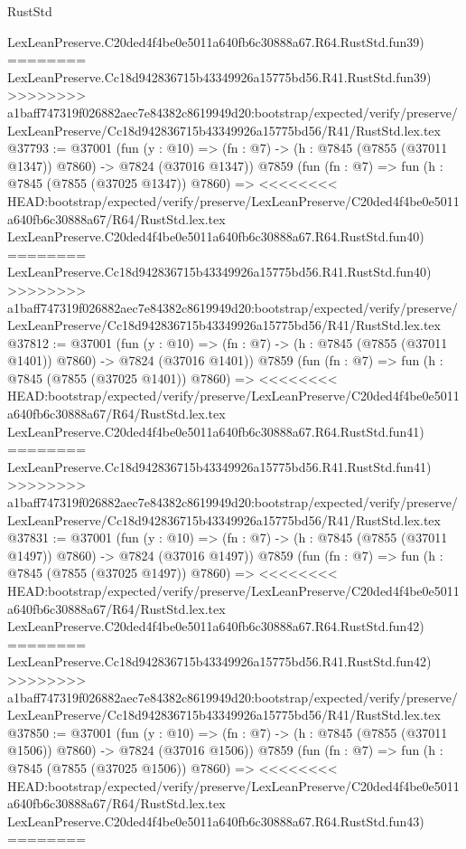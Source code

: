 \begin{lexlean}{RustStd}
\begin{coremodule}
{\begin{coremodule}
{{{{{{{{{{{{{{{{{{{{{{{{{{{{{{{{{{{{{{{{{{{{{{{{{{{{{{    LexLeanPreserve.C20ded4f4be0e5011a640fb6c30888a67.R64.RustStd.fun39)
========
    LexLeanPreserve.Cc18d942836715b43349926a15775bd56.R41.RustStd.fun39)
>>>>>>>> a1baff747319f026882aec7e84382c8619949d20:bootstrap/expected/verify/preserve/LexLeanPreserve/Cc18d942836715b43349926a15775bd56/R41/RustStd.lex.tex
@37793 := @37001
    (fun (y : @10) => (fn : @7) -> (h : @7845 (@7855 (@37011 @1347)) @7860) -> @7824 (@37016 @1347))
    @7859
    (fun (fn : @7) =>
    fun (h : @7845 (@7855 (@37025 @1347)) @7860) =>
<<<<<<<< HEAD:bootstrap/expected/verify/preserve/LexLeanPreserve/C20ded4f4be0e5011a640fb6c30888a67/R64/RustStd.lex.tex
    LexLeanPreserve.C20ded4f4be0e5011a640fb6c30888a67.R64.RustStd.fun40)
========
    LexLeanPreserve.Cc18d942836715b43349926a15775bd56.R41.RustStd.fun40)
>>>>>>>> a1baff747319f026882aec7e84382c8619949d20:bootstrap/expected/verify/preserve/LexLeanPreserve/Cc18d942836715b43349926a15775bd56/R41/RustStd.lex.tex
@37812 := @37001
    (fun (y : @10) => (fn : @7) -> (h : @7845 (@7855 (@37011 @1401)) @7860) -> @7824 (@37016 @1401))
    @7859
    (fun (fn : @7) =>
    fun (h : @7845 (@7855 (@37025 @1401)) @7860) =>
<<<<<<<< HEAD:bootstrap/expected/verify/preserve/LexLeanPreserve/C20ded4f4be0e5011a640fb6c30888a67/R64/RustStd.lex.tex
    LexLeanPreserve.C20ded4f4be0e5011a640fb6c30888a67.R64.RustStd.fun41)
========
    LexLeanPreserve.Cc18d942836715b43349926a15775bd56.R41.RustStd.fun41)
>>>>>>>> a1baff747319f026882aec7e84382c8619949d20:bootstrap/expected/verify/preserve/LexLeanPreserve/Cc18d942836715b43349926a15775bd56/R41/RustStd.lex.tex
@37831 := @37001
    (fun (y : @10) => (fn : @7) -> (h : @7845 (@7855 (@37011 @1497)) @7860) -> @7824 (@37016 @1497))
    @7859
    (fun (fn : @7) =>
    fun (h : @7845 (@7855 (@37025 @1497)) @7860) =>
<<<<<<<< HEAD:bootstrap/expected/verify/preserve/LexLeanPreserve/C20ded4f4be0e5011a640fb6c30888a67/R64/RustStd.lex.tex
    LexLeanPreserve.C20ded4f4be0e5011a640fb6c30888a67.R64.RustStd.fun42)
========
    LexLeanPreserve.Cc18d942836715b43349926a15775bd56.R41.RustStd.fun42)
>>>>>>>> a1baff747319f026882aec7e84382c8619949d20:bootstrap/expected/verify/preserve/LexLeanPreserve/Cc18d942836715b43349926a15775bd56/R41/RustStd.lex.tex
@37850 := @37001
    (fun (y : @10) => (fn : @7) -> (h : @7845 (@7855 (@37011 @1506)) @7860) -> @7824 (@37016 @1506))
    @7859
    (fun (fn : @7) =>
    fun (h : @7845 (@7855 (@37025 @1506)) @7860) =>
<<<<<<<< HEAD:bootstrap/expected/verify/preserve/LexLeanPreserve/C20ded4f4be0e5011a640fb6c30888a67/R64/RustStd.lex.tex
    LexLeanPreserve.C20ded4f4be0e5011a640fb6c30888a67.R64.RustStd.fun43)
========
}}}}}}}}}}}}}}}}}}}}}}}}}}}}}}}}}}}}}}}}}}}}}}}}}}}}}}
\end{coremodule}}
\end{coremodule}
\end{lexlean}
